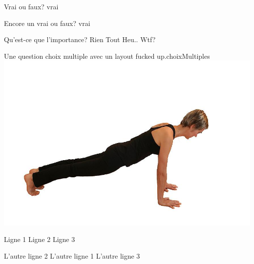 \documentclass[letterpaper,12pt]{article}
\begin{document}
\begin{questions}
  
  
  \begin{vraiOuFaux}
    {Vrai ou faux?}
    {vrai}
  \end{vraiOuFaux}
  \begin{vraiOuFaux}
    {Encore un vrai ou faux?}
    {vrai}
  \end{vraiOuFaux}
  
  
  
  

  \begin{choixMultiples}{Qu'est-ce que l'importance?} 
      \reponse	Rien
      \reponse	Tout
      \bonneReponse Heu.. Wtf?
  \end{choixMultiples}
  
  \begin{customQuestion}{Une question choix multiple avec un layout fucked up.}{choixMultiples}
  \centering 
    { %
      \includegraphics[width=.2\linewidth]{figures/uneImage.jpg}
      \label{fig:uneImage}      
    }
    \vspace{15px}
    \begin{minipage}{.4\linewidth}
      \begin{enumerate}
       \reponse	Ligne 1
       \reponse	Ligne 2
       \reponse	Ligne 3
      \end{enumerate}
    \end{minipage}
    \hspace{15px}
    \begin{minipage}{.4\linewidth}
      \begin{itemize}
       \renewcommand\labelitemi{\rule{30px}{1px}}
       \reponse	{} L'autre ligne 2
       \reponse	{} L'autre ligne 1
       \reponse	{} L'autre ligne 3
      \end{itemize}
    \end{minipage}
  \end{customQuestion}



\end{questions}
\end{document}
